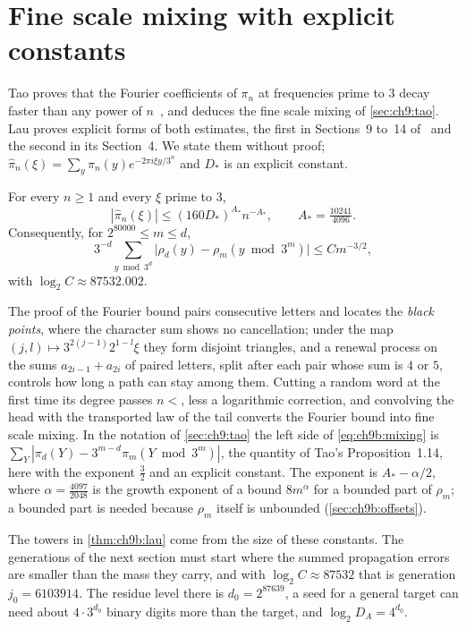 \section{Fine scale mixing with explicit constants}\label{sec:ch9b:mixing}

Tao proves that the Fourier coefficients of $\pi_n$ at frequencies prime to $3$ decay faster than any power of $n$~\cite[Proposition~1.17]{tao2022}, and deduces the fine scale mixing of \cref{sec:ch9:tao}. Lau proves explicit forms of both estimates, the first in Sections~9 to~14 of~\cite{lau2026} and the second in its Section~4. We state them without proof; $\widehat\pi_n(\xi)=\sum_y\pi_n(y)e^{-2\pi i\xi y/3^n}$ and $D_*$ is an explicit constant.

\begin{proposition}\label{prop:ch9b:mixing}
For every $n\ge1$ and every $\xi$ prime to $3$,
\[
  |\widehat\pi_n(\xi)|\le(160D_*)^{A_*}n^{-A_*},\qquad A_*=\tfrac{10241}{4096}.
\]
Consequently, for $2^{80000}\le m\le d$,
\begin{equation}\label{eq:ch9b:mixing}
  3^{-d}\sum_{y\bmod3^d}\bigl|\rho_d(y)-\rho_m(y\bmod3^m)\bigr|\le Cm^{-3/2},
\end{equation}
with $\log_2C\approx87532.002$.
\end{proposition}

The proof of the Fourier bound pairs consecutive letters and locates the \emph{black points}, where the character sum shows no cancellation; under the map $(j,l)\mapsto3^{2(j-1)}2^{1-l}\xi$ they form disjoint triangles, and a renewal process on the sums $a_{2i-1}+a_{2i}$ of paired letters, split after each pair whose sum is $4$ or $5$, controls how long a path can stay among them. Cutting a random word at the first time its degree passes $n\lt$, less a logarithmic correction, and convolving the head with the transported law of the tail converts the Fourier bound into fine scale mixing. In the notation of \cref{sec:ch9:tao} the left side of \eqref{eq:ch9b:mixing} is $\sum_Y|\pi_d(Y)-3^{m-d}\pi_m(Y\bmod3^m)|$, the quantity of Tao's Proposition~1.14, here with the exponent $\frac32$ and an explicit constant. The exponent is $A_*-\alpha/2$, where $\alpha=\frac{4097}{2048}$ is the growth exponent of a bound $8m^\alpha$ for a bounded part of $\rho_m$; a bounded part is needed because $\rho_m$ itself is unbounded (\cref{sec:ch9b:offsets}).

The towers in \cref{thm:ch9b:lau} come from the size of these constants. The generations of the next section must start where the summed propagation errors are smaller than the mass they carry, and with $\log_2C\approx87532$ that is generation $j_0=6103914$. The residue level there is $d_0=2^{87639}$, a seed for a general target can need about $4\cdot3^{d_0}$ binary digits more than the target, and $\log_2D_A=4^{d_0}$.

